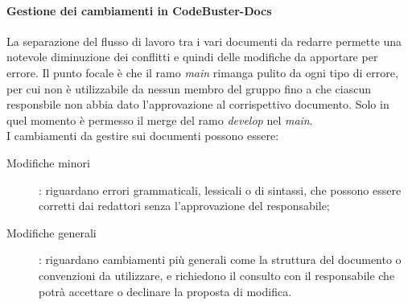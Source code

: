 \paragraph{Gestione dei cambiamenti in CodeBuster-Docs}
La separazione del flusso di lavoro tra i vari documenti da redarre permette una notevole diminuzione dei conflitti e quindi delle modifiche da apportare per errore. Il punto focale è che il ramo \textit{main} rimanga pulito da ogni tipo di errore, per cui non è utilizzabile da nessun membro del gruppo fino a che ciascun responsbile non abbia dato l'approvazione al corrispettivo documento. Solo in quel momento è permesso il merge del ramo \textit{develop} nel \textit{main}. \\
I cambiamenti da gestire sui documenti possono essere:
\begin{description}
	\item[Modifiche minori] : riguardano errori grammaticali, lessicali o di sintassi, che possono essere corretti dai redattori senza l'approvazione del responsabile;
	\item[Modifiche generali] : riguardano cambiamenti più generali come la struttura del documento o convenzioni da utilizzare, e richiedono il consulto con il responsabile che potrà accettare o declinare la proposta di modifica.
\end{description} 











